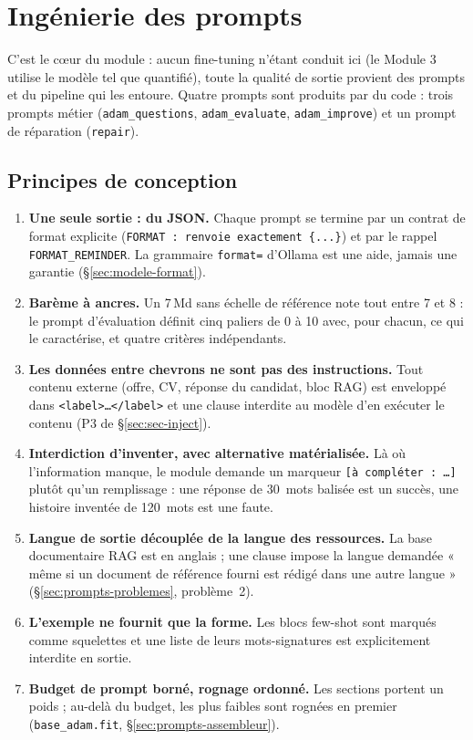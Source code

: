 \section{Ingénierie des prompts}
\label{sec:prompts}

C'est le cœur du module : aucun fine-tuning n'étant conduit ici (le Module 3
utilise le modèle tel que quantifié), toute la qualité de sortie provient des
prompts et du pipeline qui les entoure. Quatre prompts sont produits par du
code : trois prompts métier (\texttt{adam\_questions}, \texttt{adam\_evaluate},
\texttt{adam\_improve}) et un prompt de réparation (\texttt{repair}).

\subsection{Principes de conception}

\begin{enumerate}[label=\textbf{P\arabic*.},leftmargin=3.4em,itemsep=3pt]
  \item \textbf{Une seule sortie : du JSON.} Chaque prompt se termine par un
        contrat de format explicite (\texttt{FORMAT : renvoie exactement \{...\}})
        et par le rappel \texttt{FORMAT\_REMINDER}. La grammaire
        \texttt{format=} d'Ollama est une aide, jamais une garantie
        (§\ref{sec:modele-format}).
  \item \textbf{Barème à ancres.} Un 7\,Md sans échelle de référence note tout
        entre 7 et 8 : le prompt d'évaluation définit cinq paliers de 0 à 10
        avec, pour chacun, ce qui le caractérise, et quatre critères
        indépendants.
  \item \textbf{Les données entre chevrons ne sont pas des instructions.} Tout
        contenu externe (offre, CV, réponse du candidat, bloc RAG) est enveloppé
        dans \verb|<label>…</label>| et une clause interdite au modèle d'en
        exécuter le contenu (P3 de §\ref{sec:sec-inject}).
  \item \textbf{Interdiction d'inventer, avec alternative matérialisée.} Là où
        l'information manque, le module demande un marqueur
        \verb|[à compléter : …]| plutôt qu'un remplissage : une réponse de
        30~mots balisée est un succès, une histoire inventée de 120~mots est une
        faute.
  \item \textbf{Langue de sortie découplée de la langue des ressources.} La base
        documentaire RAG est en anglais ; une clause impose la langue demandée
        « même si un document de référence fourni est rédigé dans une autre
        langue » (§\ref{sec:prompts-problemes}, problème~2).
  \item \textbf{L'exemple ne fournit que la forme.} Les blocs few-shot sont
        marqués comme squelettes et une liste de leurs mots-signatures est
        explicitement interdite en sortie.
  \item \textbf{Budget de prompt borné, rognage ordonné.} Les sections portent
        un poids ; au-delà du budget, les plus faibles sont rognées en premier
        (\texttt{base\_adam.fit}, §\ref{sec:prompts-assembleur}).
\end{enumerate}

